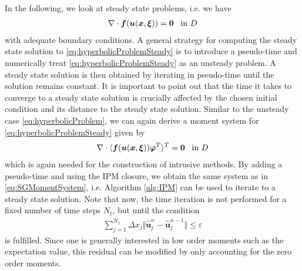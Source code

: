 In the following, we look at steady state problems, i.e. we have
\begin{align}\label{eq:hyperbolicProblemSteady}
\nabla\cdot\bm{f}(\bm{u}(\bm{x},\bm{\xi})) = \bm{0} \enskip \text{ in } D
\end{align}
with adequate boundary conditions. A general strategy for computing the steady state solution to \eqref{eq:hyperbolicProblemSteady} is to introduce a pseudo-time and numerically treat \eqref{eq:hyperbolicProblemSteady} as an unsteady problem. A steady state solution is then obtained by iterating in pseudo-time until the solution remains constant. It is important to point out that the time it takes to converge to a steady state solution is crucially affected by the chosen initial condition and its distance to the steady state solution.
Similar to the unsteady case \eqref{eq:hyperbolicProblem}, we can again derive a moment system for \eqref{eq:hyperbolicProblemSteady} given by
\begin{align}\label{eq:MomentSystemSteady}
\nabla\cdot\langle\bm{f}(\bm{u}(\bm{x},\bm{\xi}))\bm{\varphi}^T\rangle^T = \bm{0} \enskip \text{ in } D
\end{align}
which is again needed for the construction of intrusive methods. By adding a pseudo-time and using the IPM closure, we obtain the same system as in \eqref{eq:SGMomentSystem}, i.e. Algorithm \ref{alg:IPM} can be used to iterate to a steady state solution. Note that now, the time iteration is not performed for a fixed number of time steps $N_t$, but until the condition
\begin{align}\label{eq:residualSteady}
\sum_{j = 1}^{N_x} \Delta x_j \Vert \bm{\hat{u}}_j^n - \bm{\hat{u}}_j^{n-1} \Vert \leq \varepsilon
\end{align}
is fulfilled. Since one is generally interested in low order moments such as the expectation value, this residual can be modified by only accounting for the zero order moments.

